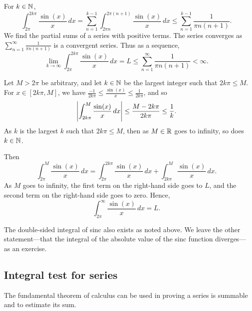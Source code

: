 \begin{example}
For $k \in {\mathbb{N}}$, 
\begin{equation*}
\int_{2\pi}^{2k\pi} \frac{\sin(x)}{x} \,dx
=
\sum_{n=1}^{k-1}
\int_{2\pi n}^{2\pi (n+1)} \frac{\sin(x)}{x} \,dx 
\leq
\sum_{n=1}^{k-1}
\frac{1}{\pi n(n+1)} .
\end{equation*}
We find the partial sums of a series with positive terms.
The series
converges as
$\sum_{n=1}^\infty \frac{1}{\pi n (n+1)}$ is a convergent series.  Thus
as a sequence,
\begin{equation*}
\lim_{k\to \infty} \int_{2\pi}^{2k\pi} \frac{\sin(x)}{x} \,dx
=L \leq
\sum_{n=1}^{\infty}
\frac{1}{\pi n(n+1)} < \infty .
\end{equation*}

Let $M > 2\pi$ be arbitrary, and let $k \in {\mathbb{N}}$
be the largest integer such that $2k\pi \leq M$.
For $x \in [2k\pi,M]$, we have 
$\frac{-1}{2k\pi} \leq \frac{\sin(x)}{x} \leq \frac{1}{2k\pi}$, and so
\begin{equation*}
\left\lvert {\int_{2k\pi}^{M} \frac{\sin(x)}{x} \,dx } \right\rvert  \leq
\frac{M-2k\pi}{2k\pi} \leq \frac{1}{k} .
\end{equation*}
As $k$ is the largest $k$ such that $2k\pi \leq M$,
then as $M\in {\mathbb{R}}$ goes to infinity, so does $k \in {\mathbb{N}}$.

Then
\begin{equation*}
\int_{2\pi}^M \frac{\sin(x)}{x}\,dx
=
\int_{2\pi}^{2k\pi} \frac{\sin(x)}{x} \,dx
+
\int_{2k\pi}^{M} \frac{\sin(x)}{x} \,dx .
\end{equation*}
As $M$ goes to infinity,
the first term on the
right-hand side goes to $L$,
and the second term on the
right-hand side
goes to zero.  Hence,
\begin{equation*}
\int_{2\pi}^\infty \frac{\sin(x)}{x} \,dx = L .
\end{equation*}

The double-sided integral of sinc also exists as noted above.
We leave the other statement---that the integral
of the absolute value of the sinc function diverges---as an exercise.
\end{example}

\subsection{Integral test for series}

The fundamental theorem 
of calculus can be used in proving a series is summable and to estimate its sum.

